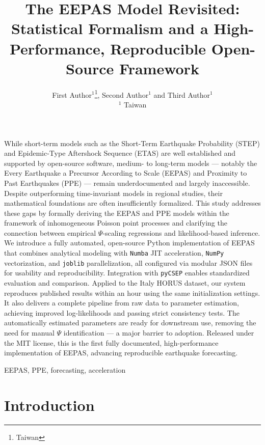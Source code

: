 \documentclass[extra,mreferee]{gji}
\title[EEPAS Software]
  {The EEPAS Model Revisited: Statistical Formalism and a High-Performance, Reproducible Open-Source Framework}
\author[First Author, Second Author and Third Author]
 {First Author$^1$\thanks{Taiwan}, 
  Second Author$^1$ and 
  Third Author$^1$ \\ 
  $^1$ Taiwan
 }
\theoremstyle{lemma}
\begin{document}
\label{firstpage}

\maketitle


\begin{summary}
While short-term models such as the Short-Term Earthquake Probability (STEP) and Epidemic-Type Aftershock Sequence (ETAS) are well established and supported by open-source software, medium- to long-term models — notably the Every Earthquake a Precursor According to Scale (EEPAS) and Proximity to Past Earthquakes (PPE) — remain underdocumented and largely inaccessible. Despite outperforming time-invariant models in regional studies, their mathematical foundations are often insufficiently formalized. This study addresses these gaps by formally deriving the EEPAS and PPE models within the framework of inhomogeneous Poisson point processes and clarifying the connection between empirical $\Psi$-scaling regressions and likelihood-based inference. We introduce a fully automated, open-source Python implementation of EEPAS that combines analytical modeling with \texttt{Numba} JIT acceleration, \texttt{NumPy} vectorization, and \texttt{joblib} parallelization, all configured via modular JSON files for usability and reproducibility. Integration with \texttt{pyCSEP} enables standardized evaluation and comparison. Applied to the Italy HORUS dataset, our system reproduces published results within an hour using the same initialization settings. It also delivers a complete pipeline from raw data to parameter estimation, achieving improved log-likelihoods and passing strict consistency tests. The automatically estimated parameters are ready for downstream use, removing the need for manual $\Psi$ identification — a major barrier to adoption. Released under the MIT license, this is the first fully documented, high-performance implementation of EEPAS, advancing reproducible earthquake forecasting.
\end{summary}

\begin{keywords}
 EEPAS, PPE, forecasting, acceleration
\end{keywords}

\section{Introduction}
\end{document}
